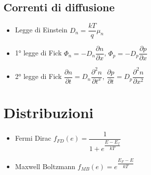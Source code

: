 \documentclass[9pt]{extarticle}
\begin{document}
\subsection{Correnti di diffusione}
\begin{itemize}
  \item Legge di Einstein \( D_n = \dfrac{k T}{q} \mu_n \)
  \item 1° legge di Fick \( \Phi_n = - D_n \dfrac{\partial n}{\partial x} \), \( \Phi_p = - D_p \dfrac{\partial p}{\partial x} \)
  \item 2° legge di Fick \( \dfrac{\partial n}{\partial t} = D_n \dfrac{\partial ^ 2 n}{\partial t ^ x}\), \( \dfrac{\partial p}{\partial t} = D_p \dfrac{\partial ^ 2 n}{\partial x ^ 2}\)
\end{itemize}

\section{Distribuzioni}
\begin{itemize}
  \item Fermi Dirac \( f_{FD} (e) = \dfrac{1}{1 + e ^{\dfrac{E - E_f}{kT}}} \)
  \item Maxwell Boltzmann \( f_{MB} (e) = e ^ {\dfrac{E_F - E}{kT}} \)
\end{itemize}
\end{document}
